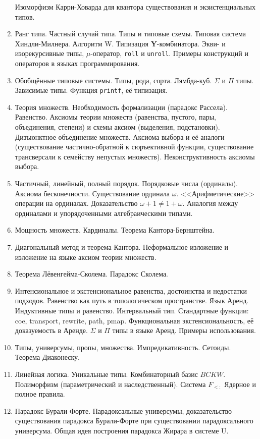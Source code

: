 \documentclass[11pt,a4paper,oneside]{article}
\begin{document}
\begin{enumerate}
Изоморфизм Карри-Ховарда для квантора существования и экзистенциальных типов.
\item Ранг типа. Частный случай типа. Типы и типовые схемы. Типовая система Хиндли-Милнера. Алгоритм W.
Типизация \textbf{Y}-комбинатора. Экви- и изорекурсивные типы, $\mu$-оператор, \texttt{roll} и \texttt{unroll}.
Примеры конструкций и операторов в языках программирования.
\item Обобщённые типовые системы. Типы, рода, сорта. Лямбда-куб. $\Sigma$ и $\Pi$ типы.
Зависимые типы. Функция \verb!printf!, её типизация.
\item Теория множеств. Необходимость формализации (парадокс Рассела). Равенство. Аксиомы теории множеств 
(равенства, пустого, пары, объединения, степени) и схемы аксиом (выделения, подстановки). Дизъюнктное объединение множеств.
Аксиома выбора и её аналоги (существование частично-обратной к сюръективной функции, существование трансверсали к семейству
непустых множеств). Неконструктивность аксиомы выбора.
\item Частичный, линейный, полный порядок. Порядковые числа (ординалы). Аксиома бесконечности. Существование ординала $\omega$. 
<<Арифметические>> операции на ординалах. Доказательство $\omega+1 \ne 1+\omega$. 
Аналогия между ординалами и упорядоченными алгебраическими типами.
\item Мощность множеств. Кардиналы. Теорема Кантора-Бернштейна. 
\item Диагональный метод и теорема Кантора. Неформальное изложение и изложение на языке аксиом теории множеств.
\item Теорема Лёвенгейма-Сколема. Парадокс Сколема.
\item Интенсиональное и экстенсиональное равенства, достоинства и недостатки подходов.
Равенство как путь в топологическом пространстве. Язык Аренд. Индуктивные типы и равенство. Интервальный тип. 
Стандартные функции: coe, transport, rewrite, path, pmap. 
Функциональная экстенсиональность, её доказуемость в Аренде. $\Sigma$ и $\Pi$ типы в языке Аренд. Примеры использования.
\item Типы, универсумы, пропы, множества. Импредикативность. Сетоиды. Теорема Диаконеску. 
\item Линейная логика. Уникальные типы. Комбинаторный базис $BCKW$.
Полиморфизм (параметрический и наследственный). Система $F_{<:}$ Ядерное и полное правила.
\item Парадокс Бурали-Форте. Парадоксальные универсумы, доказательство существования парадокса Бурали-Форте при 
существовании парадоксального универсума. Общая идея построения парадокса Жирара в системе U.
\end{enumerate}
\end{document}
